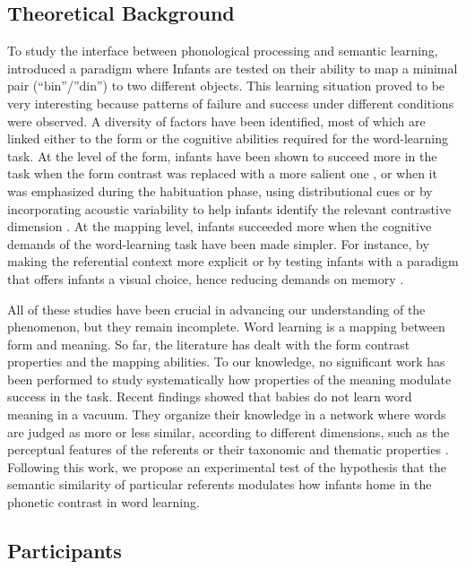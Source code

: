\documentclass[12pt]{article}
\begin{document}
\subsection{Theoretical Background}

To study the interface between phonological processing and semantic learning,  introduced a paradigm where Infants are tested on their ability to map a minimal pair (``bin''/''din'') to two different objects. This learning situation proved to be very interesting because patterns of failure and success under different conditions were observed.  A diversity of factors have been identified, most of which are linked either to the form or the cognitive abilities required for the word-learning task. At the level of the form, infants have been shown to succeed more in the task when the form contrast was replaced with a more salient one \cite{curtin2009}, or when it was emphasized during the habituation phase, using distributional cues \cite{thiessen2007b} or by incorporating acoustic variability to help infants identify the relevant contrastive dimension \cite{rost2009}.
At the mapping level, infants succeeded more when the cognitive demands of the word-learning task have been made simpler. For instance, by making the referential context more explicit \cite{fennell2010}
or by testing infants with a paradigm that offers infants a visual choice, hence reducing demands on memory \cite{yoshida2009}.

All of these studies have been crucial in advancing our understanding of the phenomenon, but they remain incomplete. Word learning is a mapping between form and meaning. So far, the literature has dealt with the form contrast properties and the mapping abilities. To our knowledge, no significant work has been performed to study systematically how properties of the meaning modulate success in the task. Recent findings showed that babies do not learn word meaning in a vacuum. They organize their knowledge in a network where words are judged as more or less similar, according to different dimensions, such as the perceptual features of the referents \cite{wojcik2013} or their  taxonomic and thematic properties  \cite{arias-trejo2013}. Following this work, we propose an experimental test of the hypothesis that the semantic similarity of particular referents modulates how infants home in the phonetic contrast in word learning. 


\subsection{Participants}
\end{document}
